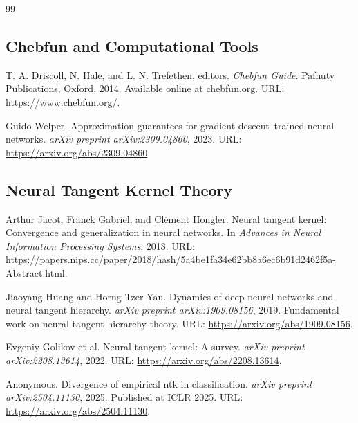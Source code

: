 \documentclass[a4paper]{article}
\theoremstyle{plain}
\theoremstyle{definition}
\theoremstyle{remark}
\begin{document}
\newpage
{}
\begin{thebibliography}{99}

\subsection*{Chebfun and Computational Tools}

\label{ref:driscoll2014chebfun}
T. A. Driscoll, N. Hale, and L. N. Trefethen, editors.
\textit{Chebfun Guide}.
Pafnuty Publications, Oxford, 2014.
Available online at chebfun.org. URL: \url{https://www.chebfun.org/}.

\label{ref:welper2023approximation}
Guido Welper.
Approximation guarantees for gradient descent--trained neural networks.
\textit{arXiv preprint arXiv:2309.04860}, 2023.
URL: \href{https://arxiv.org/abs/2309.04860}{\url{https://arxiv.org/abs/2309.04860}}.

\subsection*{Neural Tangent Kernel Theory}

\label{ref:jacot2018neural}
Arthur Jacot, Franck Gabriel, and Clément Hongler.
Neural tangent kernel: Convergence and generalization in neural networks.
In \textit{Advances in Neural Information Processing Systems}, 2018.
URL: \url{https://papers.nips.cc/paper/2018/hash/5a4be1fa34e62bb8a6ec6b91d2462f5a-Abstract.html}.

\label{ref:huang2019dynamicsdeepneuralnetworks}
Jiaoyang Huang and Horng-Tzer Yau.
Dynamics of deep neural networks and neural tangent hierarchy.
\textit{arXiv preprint arXiv:1909.08156}, 2019.
Fundamental work on neural tangent hierarchy theory.
URL: \href{https://arxiv.org/abs/1909.08156}{\url{https://arxiv.org/abs/1909.08156}}.

\label{ref:golikov2022ntk_survey}
Evgeniy Golikov et al.
Neural tangent kernel: A survey.
\textit{arXiv preprint arXiv:2208.13614}, 2022.
URL: \href{https://arxiv.org/abs/2208.13614}{\url{https://arxiv.org/abs/2208.13614}}.

\label{ref:ntk2025divergence}
Anonymous.
Divergence of empirical ntk in classification.
\textit{arXiv preprint arXiv:2504.11130}, 2025.
Published at ICLR 2025.
URL: \href{https://arxiv.org/abs/2504.11130}{\url{https://arxiv.org/abs/2504.11130}}.


\end{thebibliography}
\end{document}
